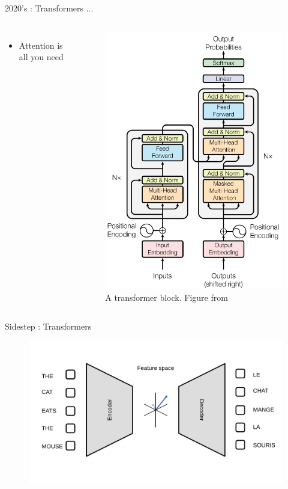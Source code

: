 \documentclass{irdbeamer}
\let\oldcite=\cite
\renewcommand{\cite}[1]{\textcolor[rgb]{.5,.5,.7}{\oldcite{#1}}}
\begin{document}
\begin{frame}[t]{2020's : Transformers ...}
\begin{columns}[t]
    \vspace{1cm}
    \begin{itemize}
        \item Attention is all you need \cite{vaswani2017attention}
    \end{itemize}
    \begin{figure}
        \centering
        \vspace{-1.5cm}
        \includegraphics[width=.6\linewidth]{figs/transformer.png}
        \caption{\tiny A transformer block. Figure from \cite{vaswani2017attention}}
    \end{figure}
\end{columns}
\end{frame} 

\begin{frame}{Sidestep : Transformers}
        \centering
    \begin{figure}
        \centering
        \includegraphics[width=.7\linewidth]{./figs/encoder_decoder.pdf}
    \end{figure}
\end{frame}
\end{document}
